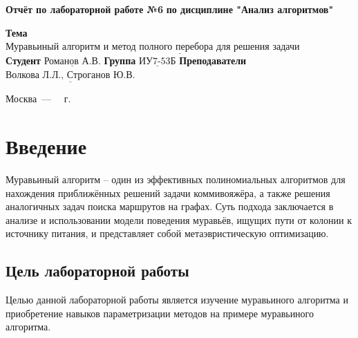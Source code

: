 \documentclass[12pt]{report}
\begin{document}
\begin{titlepage}
		
		\begin{center}
			\noindent\begin{minipage}{1.3\textwidth}\centering
				\Large\textbf{  Отчёт по лабораторной работе №6}\newline
				\textbf{по дисциплине "Анализ алгоритмов"}\newline\newline
			\end{minipage}
		\end{center}
		
		\noindent\textbf{Тема} $\underline{\text{Муравьиный алгоритм и метод полного перебора для решения задачи коммивояжёра}}$\newline\newline
		\noindent\textbf{Студент} $\underline{\text{Романов А.В.}}$\newline\newline
		\noindent\textbf{Группа} $\underline{\text{ИУ7-53Б}}$\newline\newline
		\noindent\textbf{Преподаватели} $\underline{\text{Волкова Л.Л., Строганов Ю.В.}}$\newline\newline\newline
		
		\begin{center}
			\vfill
			Москва~---~\the\year
			~г.
		\end{center}
	\end{titlepage}
	
	
	\tableofcontents
	
\newpage
\chapter*{Введение}
	
Муравьиный алгоритм -- один из эффективных полиномиальных алгоритмов для нахождения приближённых решений задачи коммивояжёра, а также решения аналогичных задач поиска маршрутов на графах. Суть подхода заключается в анализе и использовании модели поведения муравьёв, ищущих пути от колонии к источнику питания, и представляет собой метаэвристическую оптимизацию.
	
\section*{Цель лабораторной работы}
	
Целью данной лабораторной работы является изучение муравьиного алгоритма и приобретение навыков параметризации методов на примере муравьиного алгоритма.
	
\end{document}

